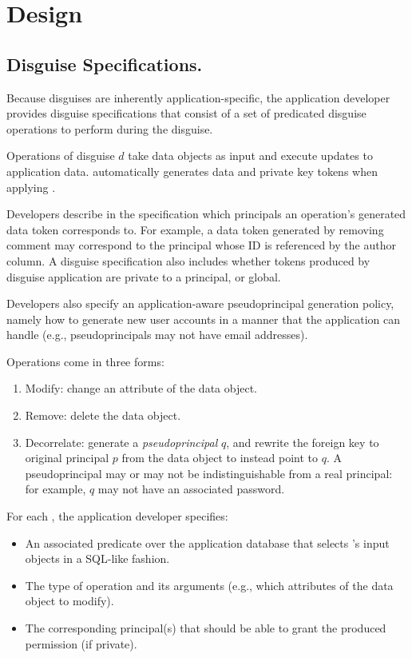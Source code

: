 \section{Design} 

\subsection{Disguise Specifications.} 
Because disguises are inherently application-specific, the application developer provides disguise
specifications that consist of a set of predicated disguise operations  to perform during the
disguise.

Operations  of disguise $d$ take data objects as input and execute updates to application
data.
\sys automatically generates data and private key tokens when applying . 

Developers describe in the specification which principals an operation's generated data token corresponds to. 
For example, a data token generated by removing comment may correspond to the principal whose ID is referenced by the author column.  
A disguise specification also includes whether tokens produced by disguise application are private
to a principal, or global.

Developers also specify an application-aware pseudoprincipal generation policy, namely how to generate new
user accounts in a manner that the application can handle (e.g., pseudoprincipals may not have email
addresses).

\vspace{6pt}\noindent
Operations come in three forms:
\begin{enumerate}
    \item Modify: change an attribute of the data object.
    \item Remove: delete the data object.
    \item Decorrelate: generate a \emph{pseudoprincipal} $q$, and rewrite the foreign key to original
        principal $p$ from the data object to instead point to $q$.
        A pseudoprincipal may or may not be indistinguishable from a real principal: for example,
        $q$ may not have an associated password.
\end{enumerate}

\noindent For each , the application developer specifies:
\begin{itemize}
    \item An associated predicate over the application database that selects 's input
        objects in a SQL-like fashion.
    \item The type of operation and its arguments (e.g., which attributes of the data object to
        modify).
    \item The corresponding principal(s) that should be able to grant the produced permission (if
        private).
\end{itemize}

